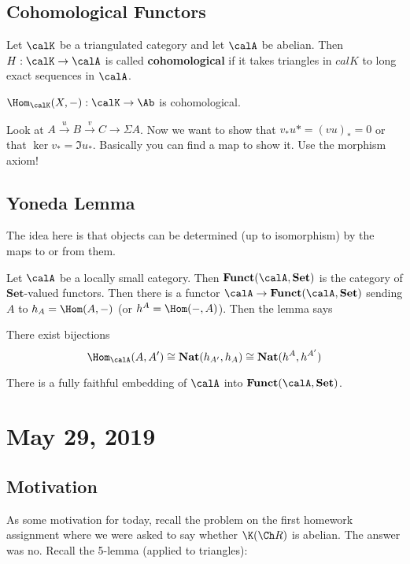\documentclass[12pt]{article}
\begin{document}
\subsection{Cohomological Functors}
\begin{defn}
Let $\calK$ be a triangulated category and let $\calA$ be abelian. Then $H:\calK\to \calA$ is called \textbf{cohomological}
if it takes triangles in $calK$ to long exact sequences in $\calA$.
\end{defn}
\begin{prop}
	$\Hom_\calK(X,-):\calK\to\Ab$ is cohomological.
\end{prop}
\begin{prf}
	Look at $A\xrightarrow{u}B\xrightarrow{v}C\to\Sigma A$. Now we want to show that $v_\ast u\ast=(vu)_\ast=0$
	or that $\ker v_\ast= \Im u_\ast$. Basically you can find a map to show it. Use the morphism axiom!
\end{prf}

\subsection{Yoneda Lemma}
The idea here is that objects can be determined (up to isomorphism) by the maps to or from them.

Let $\calA$ be a locally small category. Then $\mathbf{Funct}(\calA,\mathbf{Set})$ is the category of $\mathbf{Set}$-valued functors. Then there is a functor 
$\calA\to\mathbf{Funct}(\calA,\mathbf{Set})$ sending $A$ to $h_A=\Hom(A,-)$ (or $h^A=\Hom(-,A)$). Then the lemma says 
\begin{lem}[Yoneda]
	There exist bijections
	\[\Hom_\calA(A,A')\cong\mathbf{Nat}(h_{A'},h_A)\cong \mathbf{Nat}(h^A,h^{A'})\]
\end{lem}
\begin{cor}
	There is a fully faithful embedding of $\calA$ into $\mathbf{Funct}(\calA,\mathbf{Set})$.
\end{cor}

\section{May 29, 2019}
\subsection{Motivation}
As some motivation for today, recall the problem on the first homework assignment where we were asked to 
say whether $\K(\Ch R)$ is abelian. The answer was no. Recall the 5-lemma (applied to triangles):
\end{document}
